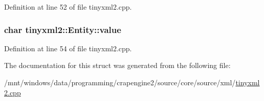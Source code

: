 Definition at line 52 of file tinyxml2.\+cpp.

\hypertarget{structtinyxml2_1_1_entity_a7334e81e33b4615655a403711b24f3ed}{}
\subsubsection[{value}]{\setlength{\rightskip}{0pt plus 5cm}char tinyxml2\+::\+Entity\+::value}\label{structtinyxml2_1_1_entity_a7334e81e33b4615655a403711b24f3ed}


Definition at line 54 of file tinyxml2.\+cpp.



The documentation for this struct was generated from the following file\+:\begin{DoxyCompactItemize}
\item 
/mnt/windows/data/programming/crapengine2/source/core/source/xml/\hyperlink{tinyxml2_8cpp}{tinyxml2.\+cpp}\end{DoxyCompactItemize}
